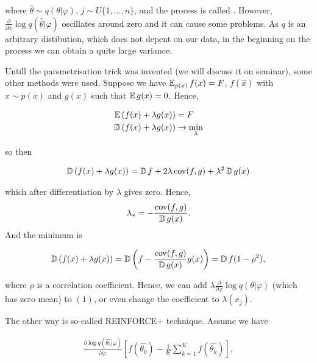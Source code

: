 where $\widehat{\theta} \sim q(\theta | \varphi)$, $j \sim U\{1, \ldots, n\}$, and the process is called . However, $\frac{\partial}{\partial x} \log q(\widehat{\theta} | \varphi)$ oscillates around zero and it can cause some problems. As $q$ is an arbitrary distibution, which does not depent on our data, in the beginning on the process we can obtain a quite large variance. 

Untill the parsmetrisation trick was invented (we will discuss it on seminar), some other methods were used. Suppose we have $\operatorname{\mathbb{E}}_{p(x)} f(x) = F$, $f(\widehat{x})$ with $\widehat{x} \sim p(x)$ and $g(x)$ such that $\operatorname{\mathbb{E}} g(x) = 0$. Hence, 

\begin{equation*}
    \begin{aligned}
        \operatorname{\mathbb{E}}\left( f(x) + \lambda g(x)\right) &= F \\ 
        \operatorname{\mathbb{D}} \left( f(x) + \lambda g(x) \right) &\to \min_\lambda
    \end{aligned}
\end{equation*}

so then

\begin{equation*}
    \begin{aligned}
        \operatorname{\mathbb{D}} \left( f(x) + \lambda g(x)\right) = \operatorname{\mathbb{D}} f + 2 \lambda \operatorname{cov}(f, g) + \lambda^2 \operatorname{\mathbb{D}} g(x) 
    \end{aligned}
\end{equation*}

which after differentiation by $\lambda$ gives zero. Hence, $$\lambda_* = - \frac{\operatorname{cov}(f, g)}{\operatorname{\mathbb{D}} g(x)}.$$ And the minimum is

\begin{equation*}
    \begin{aligned}
        \operatorname{\mathbb{D}} \left( f(x) + \lambda g(x)\right) = \operatorname{\mathbb{D}} \left( f - \frac{\operatorname{cov}(f, g)}{\operatorname{\mathbb{D}} g(x)} g(x) \right)= \operatorname{\mathbb{D}} f (1 - \rho^2),
    \end{aligned}
\end{equation*}

where $\rho$ is a correlation coefficient. Hence, we can add $\lambda \frac{\partial}{\partial \varphi} \log q(\theta | \varphi)$ (which has zero mean) to $(1)$, or even change the coefficient to $\lambda(x_j)$. 

The other way is so-called REINFORCE+ technique. Assume we have 

\begin{equation*}
    \begin{aligned}
        \frac{\partial \log q(\widehat{\theta_0} | \varphi)}{\partial \varphi} \left[ f(\widehat{\theta_0}) - \frac{1}{K} \sum_{k = 1}^K f(\widehat{\theta_k}) \right], 
    \end{aligned}
\end{equation*}

